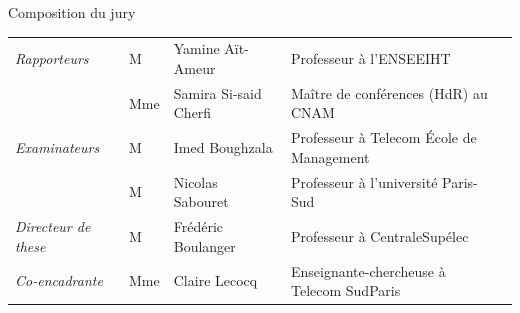 \begin{titlepage}
{\large Composition du jury}

\noindent\begin{tabulary}{\textwidth}{@{}p{0.2\textwidth}p{2em}p{0.2\textwidth}p{0.46\textwidth}L}
\midrule
\textit{Rapporteurs}         & M   & Yamine Aït-Ameur      & Professeur à l'ENSEEIHT \\
                             & Mme & Samira Si-said Cherfi & Maître de conférences (HdR) au CNAM \\
\textit{Examinateurs}        & M   & Imed Boughzala        & Professeur à Telecom École de Management \\
                             & M   & Nicolas Sabouret      & Professeur à l'université Paris-Sud \\
\textit{Directeur de these}  & M   & Frédéric Boulanger    & Professeur à CentraleSupélec \\
\textit{Co-encadrante}       & Mme & Claire Lecocq         & Enseignante-chercheuse à Telecom SudParis \\
\midrule
\end{tabulary}


\end{titlepage}
\restoregeometry
\thispagestyle{empty}
\cleardoublepage
